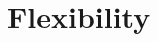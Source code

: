 \documentclass[12pt]{amsart}
\theoremstyle{definition}
\theoremstyle{plain}
\newtheorem{corollary}[theorem]{Corollary}
\theoremstyle{definition}
\newtheorem{remark}[theorem]{Remark}
\numberwithin{equation}{section}
\begin{document}









\section{Flexibility}\label{sec: flexibility}
\end{document}
